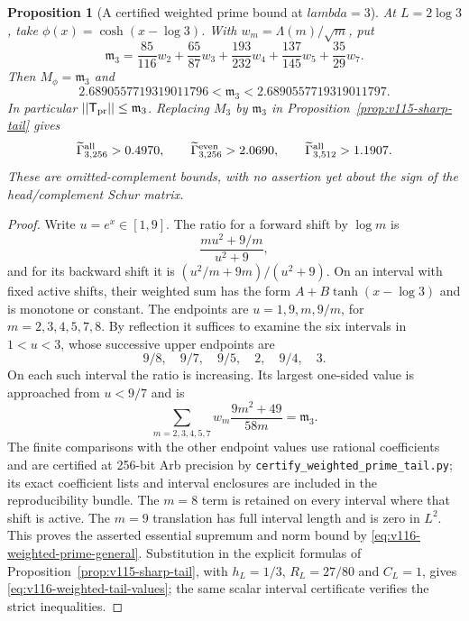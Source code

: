 \documentclass[11pt]{article}
\def\lambda{lambda}%
\def\norm#1{||#1||}%
\newtheorem{proposition}[theorem]{Proposition}
\theoremstyle{remark}
\newcommand{\norm}[1]{\left\lVert #1\right\rVert}
\begin{document}
\begin{proposition}[A certified weighted prime bound at $\lambda=3$]
\label{prop:v116-weighted-prime}
At $L=2\log3$, take $\phi(x)=\cosh(x-\log3)$. With
$w_m=\Lambda(m)/\sqrt m$, put
\begin{equation}\label{eq:v116-prime-constant}
 \mathfrak m_3=
 \frac{85}{116}w_2+\frac{65}{87}w_3+
 \frac{193}{232}w_4+\frac{137}{145}w_5+
 \frac{35}{29}w_7.
\end{equation}
Then $M_\phi=\mathfrak m_3$ and
\[
 2.6890557719319011796<\mathfrak m_3
       <2.6890557719319011797.
\]
In particular $\norm{\mathsf T_{\rm pr}}\le\mathfrak m_3$.
Replacing $M_3$ by $\mathfrak m_3$ in
Proposition~\ref{prop:v115-sharp-tail} gives
\begin{equation}\label{eq:v116-weighted-tail-values}
 \widetilde\Gamma_{3,256}^{\rm all}>0.4970,
 \qquad \widetilde\Gamma_{3,256}^{\rm even}>2.0690,
 \qquad \widetilde\Gamma_{3,512}^{\rm all}>1.1907.
\end{equation}
These are omitted-complement bounds, with no assertion yet about the
sign of the head/complement Schur matrix.
\end{proposition}
\begin{proof}
Write $u=e^x\in[1,9]$. The ratio for a forward shift by $\log m$ is
\[
 \frac{m u^2+9/m}{u^2+9},
\]
and for its backward shift it is $(u^2/m+9m)/(u^2+9)$.
On an interval with fixed active shifts, their weighted sum has the
form $A+B\tanh(x-\log3)$ and is monotone or constant. The endpoints
are $u=1,9,m,9/m$, for $m=2,3,4,5,7,8$.
By reflection it suffices to examine the six intervals in $1<u<3$,
whose successive upper endpoints are
\[
 9/8,\quad9/7,\quad9/5,\quad2,\quad9/4,\quad3.
\]
On each such interval the ratio is increasing. Its largest one-sided
value is approached from $u<9/7$ and is
\[
 \sum_{m=2,3,4,5,7}
       w_m\frac{9m^2+49}{58m}=\mathfrak m_3.
\]
The finite comparisons with the other endpoint values use rational
coefficients and are certified at 256-bit Arb precision by
\texttt{certify\_weighted\_prime\_tail.py}; its exact coefficient lists
and interval enclosures are included in the reproducibility bundle.
The $m=8$ term is retained on every interval where that shift is active.
The $m=9$ translation has full interval length and is zero in $L^2$.
This proves the asserted essential supremum and norm bound by
\eqref{eq:v116-weighted-prime-general}. Substitution in the explicit
formulas of Proposition~\ref{prop:v115-sharp-tail}, with
$h_L=1/3$, $R_L=27/80$ and $C_L=1$, gives
\eqref{eq:v116-weighted-tail-values}; the same scalar interval
certificate verifies the strict inequalities.
\end{proof}
\end{document}
